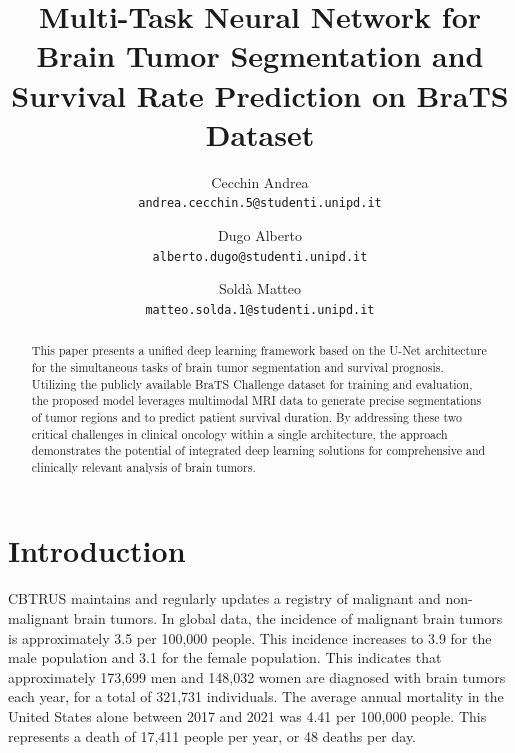 \documentclass[10pt,twocolumn,letterpaper]{article}
\begin{document}
\title{Multi-Task Neural Network for Brain Tumor Segmentation and Survival Rate Prediction on BraTS Dataset}
\author{Cecchin Andrea\\
{\tt\scriptsize andrea.cecchin.5@studenti.unipd.it}\\
\and
Dugo Alberto\\
{\tt\scriptsize alberto.dugo@studenti.unipd.it}\\
\and
Soldà Matteo\\
{\tt\scriptsize matteo.solda.1@studenti.unipd.it}\\
}
\maketitle

\begin{abstract}
    This paper presents a unified deep learning framework based on the U-Net architecture for the simultaneous tasks of brain tumor segmentation and survival prognosis. Utilizing the publicly available BraTS Challenge dataset for training and evaluation, the proposed model leverages multimodal MRI data to generate precise segmentations of tumor regions and to predict patient survival duration. By addressing these two critical challenges in clinical oncology within a single architecture, the approach demonstrates the potential of integrated deep learning solutions for comprehensive and clinically relevant analysis of brain tumors.
\end{abstract}

\section{Introduction}
CBTRUS\cite{CBTRUSTumors2022} maintains and regularly updates a registry of malignant and non-malignant brain tumors.
In global data, the incidence of malignant brain tumors is approximately 3.5 per 100,000 people. This incidence increases to 3.9 for the male population and 3.1 for the female population. This indicates that approximately 173,699 men and 148,032 women are diagnosed with brain tumors each year, for a total of 321,731 individuals. The average annual mortality in the United States alone between 2017 and 2021 was 4.41 per 100,000 people. This represents a death of 17,411 people per year, or 48 deaths per day.
\end{document}
